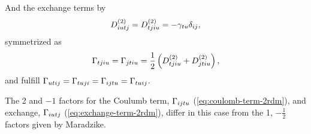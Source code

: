 And the exchange terms by
\begin{equation} \label{eq:exchange-term-2rdm}
    D^{\left( 2 \right)}_{iutj} = D^{\left( 2 \right)}_{tjiu} = - \gamma_{tu} \delta_{ij}
    ,
\end{equation}
symmetrized as
\begin{equation}
    \Gamma_{tjiu} = \Gamma_{jtiu} =
    \frac{1}{2} \left( D^{\left( 2 \right)}_{tjiu} + D^{\left( 2 \right)}_{jtiu} \right)
    ,
\end{equation}
and fulfill
$\Gamma_{utij} = \Gamma_{tuji} = \Gamma_{ijtu} = \Gamma_{tuij}$.

The 2 and $-1$ factors for the Coulumb term, $\Gamma_{ijtu}$ (\cref{eq:coulomb-term-2rdm}),
and exchange, $\Gamma_{iutj}$ (\cref{eq:exchange-term-2rdm}), differ in this
case from the 1, $-\frac{1}{2}$ factors given by Maradzike.
